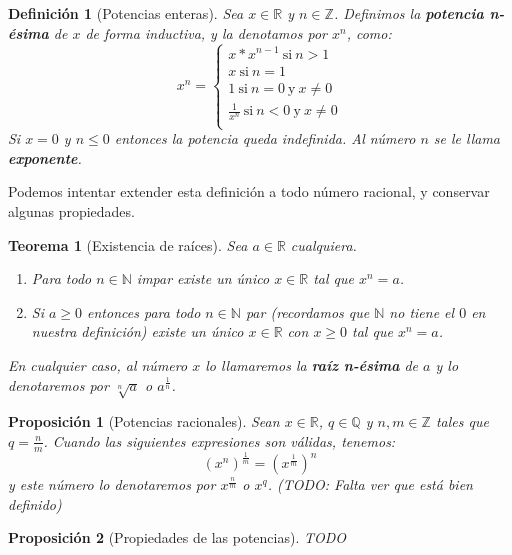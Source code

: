 \documentclass{article}
\newtheorem{theorem}{Teorema}
\newtheorem{prop}{Proposición}
\newtheorem{define}{Definición}
\begin{document}
\begin{define}[Potencias enteras]
Sea $x\in \mathbb{R}$ y $n\in \mathbb{Z}$. Definimos la \textbf{potencia n-ésima} de $x$ de forma inductiva, y la denotamos por $x^n$, como:
\begin{equation}
x^n = \left\lbrace
\begin{array}{l}
x * x^{n-1}\ \text{si}\ n > 1 \\
x\ \text{si}\ n = 1 \\
1\ \text{si}\ n = 0\ \text{y}\ x \neq 0 \\
\frac{1}{x^n}\ \text{si}\ n < 0\ \text{y}\ x \neq 0 \\
\end{array}
\right.
\end{equation}
Si $x = 0$ y $n \leq 0$ entonces la potencia queda indefinida. Al número $n$ se le llama \textbf{exponente}.
\end{define}

Podemos intentar extender esta definición a todo número racional, y conservar algunas propiedades.

\begin{theorem}[Existencia de raíces]
Sea $a \in \mathbb{R}$ cualquiera.
\begin{enumerate}
\item
Para todo $n \in \mathbb{N}$ impar existe un único $x\in \mathbb{R}$ tal que $x^n = a$.
\item
Si $a\geq 0$ entonces para todo $n \in \mathbb{N}$ par (recordamos que $\mathbb{N}$ no tiene el $0$ en nuestra definición) existe un único $x\in \mathbb{R}$ con $x\geq 0$ tal que $x^n = a$.
\end{enumerate}
En cualquier caso, al número $x$ lo llamaremos la \textbf{raíz n-ésima} de $a$ y lo denotaremos por $\sqrt[n]{a}$ o $a^{\frac{1}{n}}$.
\end{theorem}

\begin{prop}[Potencias racionales]
Sean $x \in \mathbb{R}$, $q \in \mathbb{Q}$ y $n,m \in \mathbb{Z}$ tales que $q = \frac{n}{m}$. Cuando las siguientes expresiones son válidas, tenemos:
\begin{equation}
(x^n)^{\frac{1}{m}} = (x^{\frac{1}{m}})^n
\end{equation}
y este número lo denotaremos por $x^{\frac{n}{m}}$ o $x^q$. (TODO: Falta ver que está bien definido)
\end{prop}

\begin{prop}[Propiedades de las potencias]
TODO

\end{prop}
\end{document}
